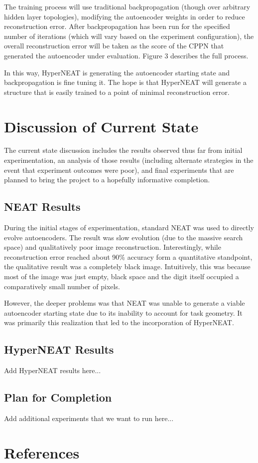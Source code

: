 \documentclass{acm_proc_article-sp}
\begin{document}
The training process will use traditional backpropagation (though over arbitrary hidden layer topologies), modifying the autoencoder weights in order to reduce reconstruction error.  After backpropagation has been run for the specified number of iterations (which will vary based on the experiment configuration), the overall reconstruction error will be taken as the score of the CPPN that generated the autoencoder under evaluation.  Figure 3 describes the full process.

In this way, HyperNEAT is generating the autoencoder starting state and backpropagation is fine tuning it.  The hope is that HyperNEAT will generate a structure that is easily trained to a point of minimal reconstruction error.


\section{Discussion of Current State}
The current state discussion includes the results observed thus far from initial experimentation, an analysis of those results (including alternate strategies in the event that experiment outcomes were poor), and final experiments that are planned to bring the project to a hopefully informative completion.

\subsection{NEAT Results}
During the initial stages of experimentation, standard NEAT was used to directly evolve autoencoders.  The result was slow evolution (due to the massive search space) and qualitatively poor image reconstruction.  Interestingly, while reconstruction error reached about 90\% accuracy form a quantitative standpoint, the qualitative result was a completely black image.  Intuitively, this was because most of the image was just empty, black space and the digit itself occupied a comparatively small number of pixels.

However, the deeper problems was that NEAT was unable to generate a viable autoencoder starting state due to its inability to account for task geometry.  It was primarily this realization that led to the incorporation of HyperNEAT.

\subsection{HyperNEAT Results}

Add HyperNEAT results here...

\subsection{Plan for Completion}

Add additional experiments that we want to run here...

\section{References}

\end{document}
